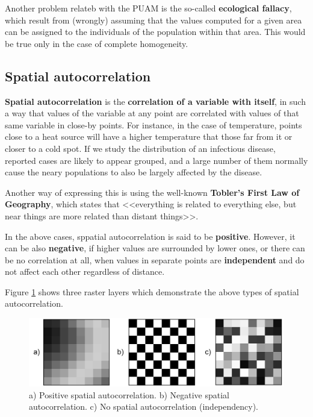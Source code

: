 Another problem relateb with the PUAM is the so-called \textbf{ecological fallacy}, which result from (wrongly) assuming that the values computed for a given area can be assigned to the individuals of the population within that area. This would be true only in the case of complete homogeneity.


\subsection{Spatial autocorrelation} 

\textbf{Spatial autocorrelation} is the \textbf{correlation of a variable with itself}, in such a way that values of the variable at any point are correlated with values of that same variable in close-by points. For instance, in the case of temperature, points close to a heat source will have a higher temperature that those far from it or closer to a cold spot. If we study the distribution of an infectious disease, reported cases are likely to appear grouped, and a large number of them normally cause the neary populations to also be largely affected by the disease.

Another way of expressing this is using the well-known \textbf{Tobler's First Law of Geography}, which states that <<everything is related to everything else, but near things are more related than distant things>>.

In the above cases, sppatial autocorrelation is said to be \textbf{positive}. However, it can be also \textbf{negative}, if higher values are surrounded by lower ones, or there can be no correlation at all, when values in separate points are \textbf{independent} and do not affect each other regardless of distance.

Figure \ref{Fig:Autocorrelation} shows three raster layers which demonstrate the above types of spatial autocorrelation.

\begin{figure}[!hbt]   
\centering
\includegraphics[width=\textwidth]{Analysis/Autocorrelation.png}
\caption{\small a) Positive spatial autocorrelation. b) Negative spatial autocorrelation. c) No spatial autocorrelation (independency).}
\label{Fig:Autocorrelation} 
\end{figure}

